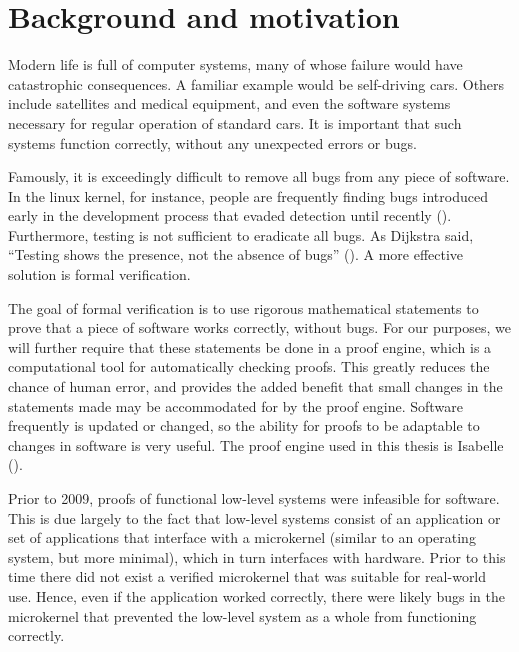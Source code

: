\documentclass[twoside]{memoir}
\begin{document}
\section{Background and motivation}

Modern life is full of computer systems,
many of whose failure would have catastrophic consequences.
A familiar example would be self-driving cars.
Others include satellites and medical equipment, and even the software systems necessary for regular operation of standard cars.
It is important that such systems function correctly, without any
unexpected errors or bugs.

Famously, it is exceedingly difficult to remove all bugs
from any piece of software.
In the linux kernel, for instance, people are frequently finding bugs
introduced early in the development process that evaded detection until recently
(\cite{Amlogic2016S905}).
Furthermore, testing is not sufficient to eradicate all bugs.
As Dijkstra said, ``Testing shows the presence, not the absence of bugs''
(\cite{dijkstra-quote}).
A more effective solution is formal verification.

The goal of formal verification is to use rigorous mathematical statements
to prove that a piece of software works correctly, without bugs.
For our purposes, we will further require that these statements be
done in a proof engine, which is a computational tool for 
automatically checking proofs.
This greatly reduces the chance of human error,
and provides the added benefit that small changes in the statements made
may be accommodated for by the proof engine.
Software frequently is updated or changed, so the ability for proofs
to be adaptable to changes in software is very useful.
The proof engine used in this thesis is Isabelle (\cite{wenzel2008isabelle}).

Prior to 2009, proofs of functional low-level systems were
infeasible for software.
This is due largely to the fact that low-level systems consist of
an application or set of applications that interface with
a microkernel (similar to an operating system, but more minimal),
which in turn interfaces with hardware.
Prior to this time there did not exist a verified microkernel
that was suitable for real-world use.
Hence, even if the application worked correctly,
there were likely bugs in the microkernel that prevented the low-level system
as a whole from functioning correctly.
\end{document}
